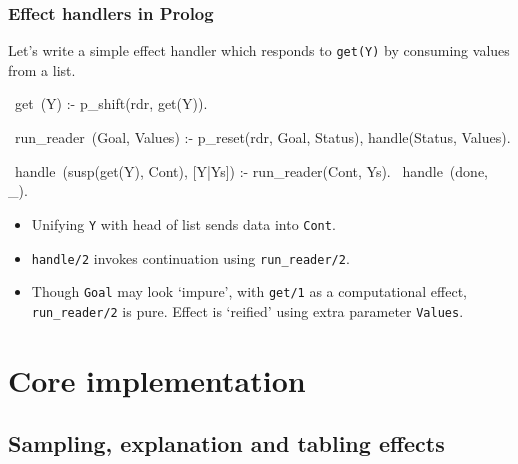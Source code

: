 \documentclass[usenames,dvipsnames]{beamer}
\newenvironment{fframe}[1][untitled]{\begin{frame}[fragile,environment=fframe]\frametitle{{#1}}}{\end{frame}}
\def\pl#1{\lstinline[language={[SWI]Prolog},columns=fullflexible]{#1}}
\begin{document}
\begin{fframe}[Effect handlers in Prolog]
Let's write a simple effect handler which responds to \pl{get(Y)} by consuming values from a list.
\begin{prolog}[frame=lines,belowskip=0em,xleftmargin=0em,basicstyle=\small]
  ~get~(Y) :- p_shift(rdr, get(Y)).

  ~run_reader~(Goal, Values) :-
    p_reset(rdr, Goal, Status), handle(Status, Values).

  ~handle~(susp(get(Y), Cont), [Y|Ys]) :- run_reader(Cont, Ys).
  ~handle~(done, _).
\end{prolog}
\begin{itemize}
  \item<2-> Unifying \pl{Y} with head of list sends data into \pl{Cont}.
  \item<3-> \pl{handle/2} invokes continuation using \pl{run_reader/2}.
  \item<4-> Though \pl{Goal} may look `impure', with \pl{get/1} as a computational effect,
  \pl{run_reader/2} is pure. Effect is `reified' using extra parameter \pl{Values}.
\end{itemize}
\end{fframe}


\section{Core implementation}

\subsection{Sampling, explanation and tabling effects}
\end{document}
